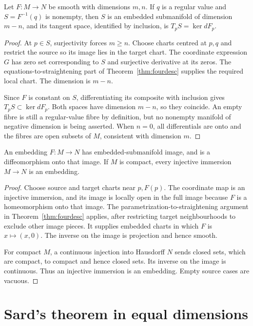 \begin{theorem}\label{thm:regularvalue}
Let $F:M\to N$ be smooth with dimensions $m,n$. If $q$ is a regular value and $S=F^{-1}(q)$ is nonempty, then $S$ is an embedded submanifold of dimension $m-n$, and its tangent space, identified by inclusion, is $T_pS=\ker dF_p$.
\end{theorem}
\begin{proof}
At $p\in S$, surjectivity forces $m\ge n$. Choose charts centred at $p,q$ and restrict the source so its image lies in the target chart. The coordinate expression $G$ has zero set corresponding to $S$ and surjective derivative at its zeros. The equations-to-straightening part of Theorem~\ref{thm:fourdesc} supplies the required local chart. The dimension is $m-n$.

Since $F$ is constant on $S$, differentiating its composite with inclusion gives $T_pS\subset\ker dF_p$. Both spaces have dimension $m-n$, so they coincide. An empty fibre is still a regular-value fibre by definition, but no nonempty manifold of negative dimension is being asserted. When $n=0$, all differentials are onto and the fibres are open subsets of $M$, consistent with dimension $m$.
\end{proof}

\begin{proposition}\label{prop:embedding}
An embedding $F:M\to N$ has embedded-submanifold image, and is a diffeomorphism onto that image. If $M$ is compact, every injective immersion $M\to N$ is an embedding.
\end{proposition}
\begin{proof}
Choose source and target charts near $p,F(p)$. The coordinate map is an injective immersion, and its image is locally open in the full image because $F$ is a homeomorphism onto that image. The parametrization-to-straightening argument in Theorem~\ref{thm:fourdesc} applies, after restricting target neighbourhoods to exclude other image pieces. It supplies embedded charts in which $F$ is $x\mapsto(x,0)$. The inverse on the image is projection and hence smooth.

For compact $M$, a continuous injection into Hausdorff $N$ sends closed sets, which are compact, to compact and hence closed sets. Its inverse on the image is continuous. Thus an injective immersion is an embedding. Empty source cases are vacuous.
\end{proof}

\section{Sard's theorem in equal dimensions}

